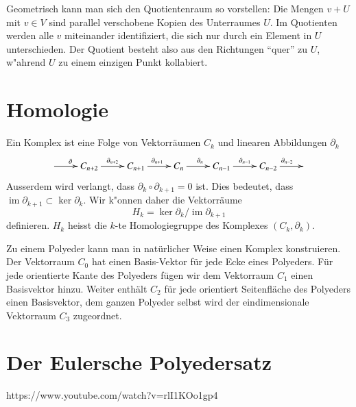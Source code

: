 Geometrisch kann man sich den Quotientenraum so vorstellen:
Die Mengen $v+U$ mit $v\in V$ sind parallel verschobene Kopien des
Unterraumes $U$.
Im Quotienten werden alle $v$ miteinander identifiziert, die sich nur
durch ein Element in $U$ unterschieden.
Der Quotient besteht also aus den Richtungen ``quer'' zu $U$, w"ahrend 
$U$ zu einem einzigen Punkt kollabiert.

\section{Homologie}
Ein Komplex ist eine Folge von Vektorräumen $C_k$ und linearen Abbildungen
$\partial_k$
\[
\xymatrix{
*+\txt{} \ar[r]^{\partial}
	&C_{n+2} \ar[r]^{\partial_{n+2}}
		&C_{n+1} \ar[r]^{\partial_{n+1}}
			&C_{n} \ar[r]^{\partial_n}
				&C_{n-1} \ar[r]^{\partial_{n-1}}
					&C_{n-2} \ar[r]^{\partial_{n-2}}
						&*+\txt{}
}
\]
Ausserdem wird verlangt, dass $\partial_{k} \circ \partial_{k+1}=0$ ist.
Dies bedeutet, dass
$\operatorname{im}\partial_{k+1}\subset \operatorname{ker}\partial_{k}$.
Wir k"onnen daher die Vektorräume
\[
H_k = \operatorname{ker}\partial_k/\operatorname{im}\partial_{k+1}
\]
definieren.
$H_k$ heisst die $k$-te Homologiegruppe des Komplexes $(C_k,\partial_k)$.

Zu einem Polyeder kann man in natürlicher Weise einen Komplex konstruieren.
Der Vektorraum $C_0$ hat einen Basis-Vektor für jede Ecke eines Polyeders.
Für jede orientierte Kante des Polyeders fügen wir dem Vektorraum $C_1$
einen Basisvektor hinzu. 
Weiter enthält $C_2$ für jede orientiert Seitenfläche des Polyeders
einen Basisvektor, dem ganzen Polyeder selbst wird der eindimensionale
Vektorraum $C_3$ zugeordnet.

\section{Der Eulersche Polyedersatz}




https://www.youtube.com/watch?v=rlI1KOo1gp4
